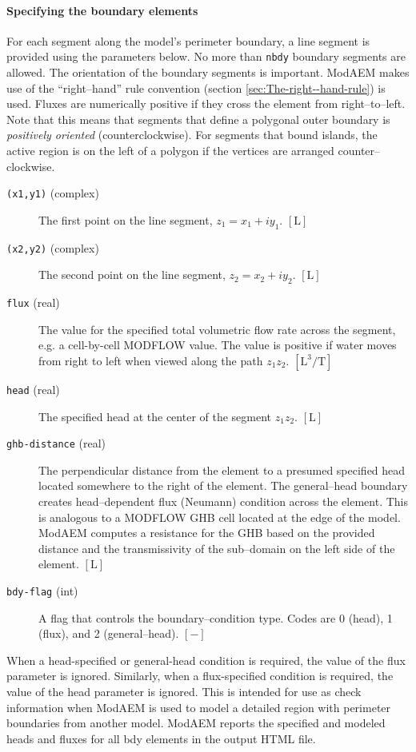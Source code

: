 \paragraph{Specifying the boundary elements}
For each segment along the model's perimeter boundary, a line segment is provided using the parameters below. No more than \texttt{nbdy} boundary segments are allowed. The orientation of the boundary segments is important. ModAEM makes use of the ``right--hand'' rule convention (section \ref{sec:The-right--hand-rule}) is used. Fluxes are numerically positive if they cross the element from right--to--left. Note that this means that segments that define a polygonal outer boundary is \emph{positively oriented} (counterclockwise). For segments that bound islands, the active region is on the left of a polygon if the vertices are arranged counter--clockwise.
\begin{description}
\item [{\texttt{(x1,y1)}} (complex)] The first point on the line segment, $z_{1}=x_{1}+iy_{1}$. $[\mathrm{L}]$
\item [{\texttt{(x2,y2)}} (complex)] The second point on the line segment, $z_{2}=x_{2}+iy_{2}$. $[\mathrm{L}]$
\item [{\texttt{flux}} (real)] The value for the specified total volumetric flow rate across the segment, e.g. a cell-by-cell MODFLOW value. The value is positive if water moves from right to left when viewed along the path $z_{1}z_{2}.$ $[\mathrm{L^{3}/T}]$
\item [{\texttt{head}} (real)] The specified head at the center of the segment $z_{1}z_{2}$. $[\mathrm{L}]$
\item [{\texttt{ghb-distance}} (real)] The perpendicular distance from the element to a presumed specified head located somewhere to the right of the element. The general--head boundary creates head--dependent flux (Neumann) condition across the element. This is analogous to a MODFLOW GHB cell located at the edge of the model. ModAEM computes a resistance for the GHB based on the provided distance and the transmissivity of the sub--domain on the left side of the element. $[\mathrm{L}]$
\item [{\texttt{bdy-flag}} (int)] A flag that controls the boundary--condition type. Codes are 0 (head), 1 (flux), and 2 (general--head). $[\mathrm{-}]$
\end{description}
When a head-specified or general-head condition is required, the value of the flux parameter is ignored. Similarly, when a flux-specified condition is required, the value of the head parameter is ignored. This is intended for use as check information when ModAEM is used to model a detailed region with perimeter boundaries from another model. ModAEM reports the specified and modeled heads and fluxes for all \textsf{bdy} elements in the output HTML file.

